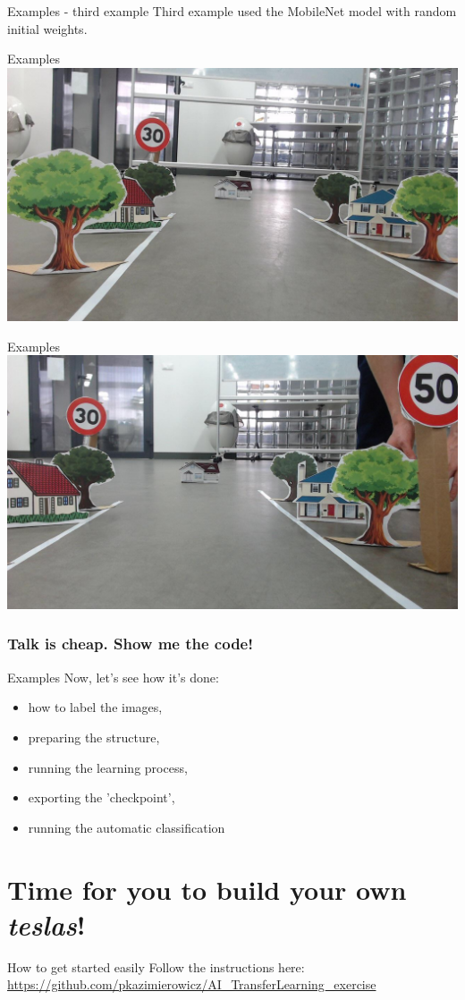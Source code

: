 \documentclass[aspectratio=1610,english]{beamer} %
\begin{document}
	
  	\begin{frame}{Examples - third example}
		Third example used the MobileNet model with random initial weights.
	\end{frame}
  	\begin{frame}{Examples}
		\includegraphics[scale=0.3]{examples/no_fine_tune_checkpoint_1000_step/session_one-6.jpg}
	\end{frame}
  	\begin{frame}{Examples}
		\includegraphics[scale=0.3]{examples/no_fine_tune_checkpoint_1000_step/session_one-10.jpg}
	\end{frame}
	
  	
  	\section{Talk is cheap. Show me the code!}
	\begin{frame}{Examples}
	Now, let's see how it's done:
		\begin{itemize}
			\item how to label the images,
			\item preparing the structure,
			\item running the learning process,
			\item exporting the 'checkpoint',
			\item running the automatic classification
		\end{itemize}
	\end{frame}
	
	
\part{Time for you to build your own \textit{teslas}!}
	\begin{frame}{How to get started easily}
	Follow the instructions here:
	\url{https://github.com/pkazimierowicz/AI_TransferLearning_exercise}
	\end{frame}
\end{document}
